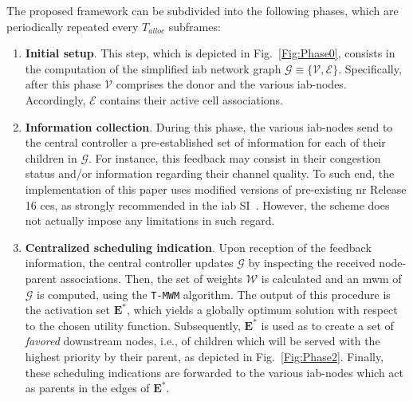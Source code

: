 The proposed framework can be subdivided into the following phases, which are periodically repeated every $T_{alloc}$ subframes:
\begin{enumerate}
\item \label{Enum_frameword:item_one} \textbf{Initial setup}. This step, which is depicted in Fig.~\ref{Fig:Phase0}, consists in the computation of the simplified \gls{iab} network graph $\mathcal{G} \equiv \{ \mathcal{V}, \mathcal{E} \}$. Specifically, after this phase $\mathcal{V}$ comprises the donor and the various \gls{iab}-nodes. Accordingly, $\mathcal{E}$ contains their active cell associations.

\item \label{Enum_frameword:item_two} \textbf{Information collection}. During this phase, the various \gls{iab}-nodes send to the central controller a pre-established set of information for each of their children in $\mathcal{G}$. For instance, this feedback may consist in their congestion status and/or  information regarding their channel quality. To such end, the implementation of this paper uses modified versions of pre-existing \gls{nr} Release 16 \glspl{ce}, as strongly recommended in the \gls{iab} SI~\cite{3gpp_38_874}. However, the scheme does not actually impose any limitations in such regard.
\item \label{Enum_frameword:item_three} \textbf{Centralized scheduling indication}. Upon reception of the feedback information, the central controller updates $\mathcal{G}$ by inspecting the received node-parent associations. Then, the set of weights $\mathcal{W}$ is calculated and an \gls{mwm} of $\mathcal{G}$ is computed, using the \texttt{T-MWM} algorithm. The output of this procedure is the activation set $\mathbf{E^*}$, which yields a globally optimum solution with respect to the chosen utility function. Subsequently, $\mathbf{E^*}$ is used as to create a set of \textit{favored} downstream nodes, i.e., of children which will be served with the highest priority by their parent, as depicted in Fig.~\ref{Fig:Phase2}. Finally, these scheduling indications are forwarded to the various \gls{iab}-nodes which act as parents in the edges of $\mathbf{E^*}$.


\end{enumerate}
